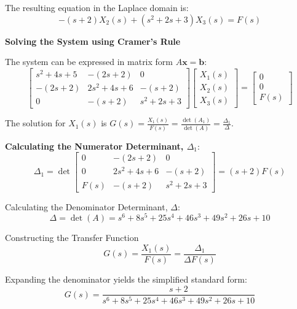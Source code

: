 \documentclass[11pt]{article}
\begin{document}
The resulting equation in the Laplace domain is:
\begin{equation}
-(s + 2)X_2(s) + (s^2 + 2s + 3)X_3(s) = F(s) \tag{3}
\end{equation}

\noindent\textbf{Solving the System using Cramer's Rule}
\vspace{12pt}

The system can be expressed in matrix form $A\mathbf{x} = \mathbf{b}$:
$$
\begin{bmatrix}
s^2 + 4s + 5 & -(2s + 2) & 0 \\
-(2s + 2) & 2s^2 + 4s + 6 & -(s + 2) \\
0 & -(s + 2) & s^2 + 2s + 3
\end{bmatrix}
\begin{bmatrix}
X_1(s) \\
X_2(s) \\
X_3(s)
\end{bmatrix}
=
\begin{bmatrix}
0 \\
0 \\
F(s)
\end{bmatrix}
$$

The solution for $X_1(s)$ is $G(s) = \frac{X_1(s)}{F(s)} = \frac{\det(A_1)}{\det(A)} = \frac{\Delta_1}{\Delta}$.

\vspace{12pt}
\noindent\textbf{Calculating the Numerator Determinant, $\Delta_1$}:
$$ \Delta_1 = \det
\begin{bmatrix}
0 & -(2s + 2) & 0 \\
0 & 2s^2 + 4s + 6 & -(s + 2) \\
F(s) & -(s + 2) & s^2 + 2s + 3
\end{bmatrix}
= (s + 2)F(s) $$

{Calculating the Denominator Determinant, $\Delta$}:
$$\Delta = \det(A) = s^6 + 8s^5 + 25s^4 + 46s^3 + 49s^2 + 26s + 10$$

{Constructing the Transfer Function}
$$G(s) = \frac{X_1(s)}{F(s)} = \frac{\Delta_1}{\Delta F(s)}$$

Expanding the denominator yields the simplified standard form:
\[
\boxed{
G(s) = \frac{s + 2}{s^6 + 8s^5 + 25s^4 + 46s^3 + 49s^2 + 26s + 10}
}
\]
\end{document}
